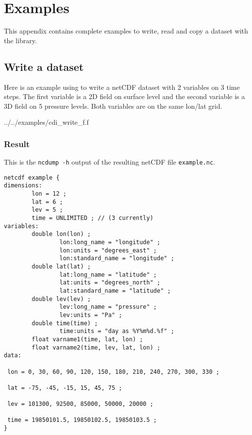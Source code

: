 
\chapter{\label{example}Examples}

This appendix contains complete examples to write, read
and copy a dataset with the {\CDI} library.


\section{\label{example_write}Write a dataset}

Here is an example using {\CDI} to write a netCDF dataset with 
2 variables on 3 time steps. The first variable is a 2D field
on surface level and the second variable is a 3D field on 5 pressure
levels. Both variables are on the same lon/lat grid. 


{../../examples/cdi_write_f.f}


\subsection{Result}

This is the {\tt ncdump -h} output of the resulting netCDF file {\tt example.nc}.

\begin{lstlisting}[]
netcdf example {
dimensions:
        lon = 12 ;
        lat = 6 ;
        lev = 5 ;
        time = UNLIMITED ; // (3 currently)
variables:
        double lon(lon) ;
                lon:long_name = "longitude" ;
                lon:units = "degrees_east" ;
                lon:standard_name = "longitude" ;
        double lat(lat) ;
                lat:long_name = "latitude" ;
                lat:units = "degrees_north" ;
                lat:standard_name = "latitude" ;
        double lev(lev) ;
                lev:long_name = "pressure" ;
                lev:units = "Pa" ;
        double time(time) ;
                time:units = "day as %Y%m%d.%f" ;
        float varname1(time, lat, lon) ;
        float varname2(time, lev, lat, lon) ;
data:

 lon = 0, 30, 60, 90, 120, 150, 180, 210, 240, 270, 300, 330 ;

 lat = -75, -45, -15, 15, 45, 75 ;

 lev = 101300, 92500, 85000, 50000, 20000 ;

 time = 19850101.5, 19850102.5, 19850103.5 ;
}
\end{lstlisting}


